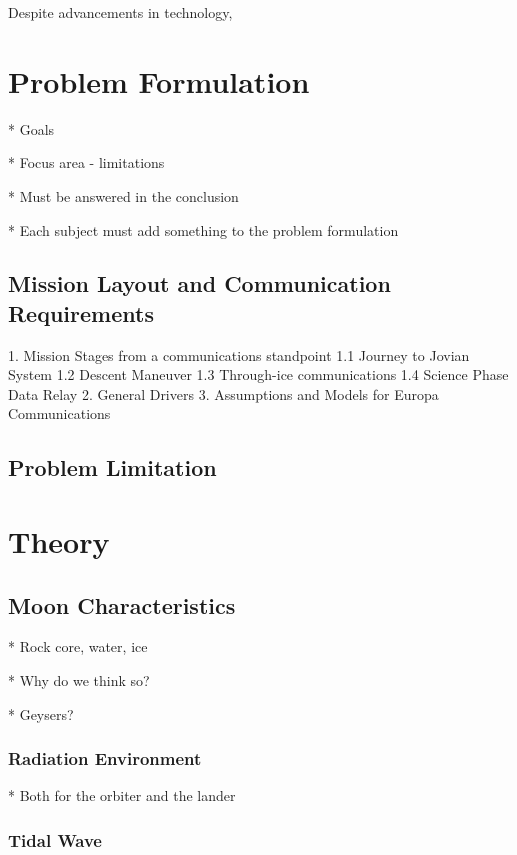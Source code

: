 \documentclass{book}
\begin{document}
Despite advancements in technology,

\section{Problem Formulation}

* Goals

* Focus area - limitations

* Must be answered in the conclusion

* Each subject must add something to the problem formulation

\subsection{Mission Layout and Communication Requirements}

1. Mission Stages from a communications standpoint
    1.1 Journey to Jovian System
    1.2 Descent Maneuver
    1.3 Through-ice communications
    1.4 Science Phase Data Relay
2. General Drivers
3. Assumptions and Models for Europa Communications

\subsection{Problem Limitation}

\section{\textbf{Theory}}


\subsection{Moon Characteristics} %

* Rock core, water, ice

    * Why do we think so?
    
    * Geysers?
    
\subsubsection{Radiation Environment} %

* Both for the orbiter and the lander

\subsubsection{Tidal Wave} %
\end{document}
